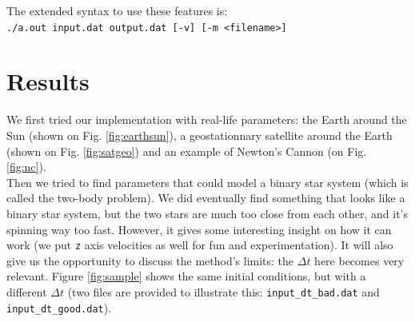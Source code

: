 \documentclass{article}
\begin{document}
The extended syntax to use these features is:\\
\texttt{./a.out input.dat output.dat [-v] [-m <filename>]}


\section*{Results}
We first tried our implementation with real-life parameters: the Earth around the Sun (shown on Fig. \ref{fig:earthsun}), a geostationnary satellite around the Earth (shown on Fig. \ref{fig:satgeo}) and an example of Newton's Cannon (on Fig. \ref{fig:nc}).\\

Then we tried to find parameters that could model a binary star system (which is called the two-body problem). We did eventually find something that looks like a binary star system, but the two stars are much too close from each other, and it's spinning way too fast. However, it gives some interesting insight on how it can work (we put \texttt{z} axis velocities as well for fun and experimentation). It will also give us the opportunity to discuss the method's limits: the $\Delta t$ here becomes very relevant. Figure \ref{fig:sample} shows the same initial conditions, but with a different $\Delta t$ (two files are provided to illustrate this: \texttt{input\_dt\_bad.dat} and \texttt{input\_dt\_good.dat}). 
\end{document}
